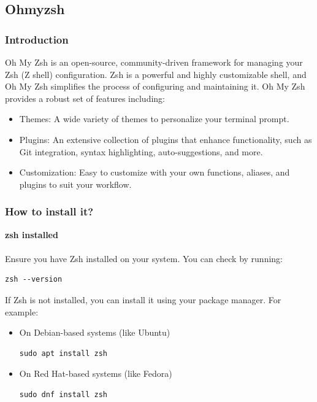 \documentclass{article}
\newenvironment{codetemplate}[1][]{%
  \mybasecolorbox[#1]
  \itshape
}{%
  \endmybasecolorbox
}
\begin{document}
\subsection{Ohmyzsh}

\subsubsection{Introduction}

Oh My Zsh is an open-source, community-driven framework for managing your Zsh (Z shell) configuration. Zsh is a powerful and highly customizable shell, and Oh My Zsh simplifies the process of configuring and maintaining it. Oh My Zsh provides a robust set of features including:

\begin{itemize}
    \item Themes: A wide variety of themes to personalize your terminal prompt.
    \item Plugins: An extensive collection of plugins that enhance functionality, such as Git integration, syntax highlighting, auto-suggestions, and more.
    \item Customization: Easy to customize with your own functions, aliases, and plugins to suit your workflow.
\end{itemize}

\subsubsection{How to install it?}

\textbf{zsh installed}
\\\\
Ensure you have Zsh installed on your system. You can check by running:
\begin{codetemplate}
\begin{verbatim}
zsh --version
\end{verbatim}
\end{codetemplate}

If Zsh is not installed, you can install it using your package manager. For example:
\begin{itemize}
    \item On Debian-based systems (like Ubuntu)
\begin{codetemplate}
\begin{verbatim}
sudo apt install zsh
\end{verbatim}
\end{codetemplate}
    \item On Red Hat-based systems (like Fedora)
\begin{codetemplate}
\begin{verbatim}
sudo dnf install zsh
\end{verbatim}
\end{codetemplate}
\end{itemize}
\end{document}
